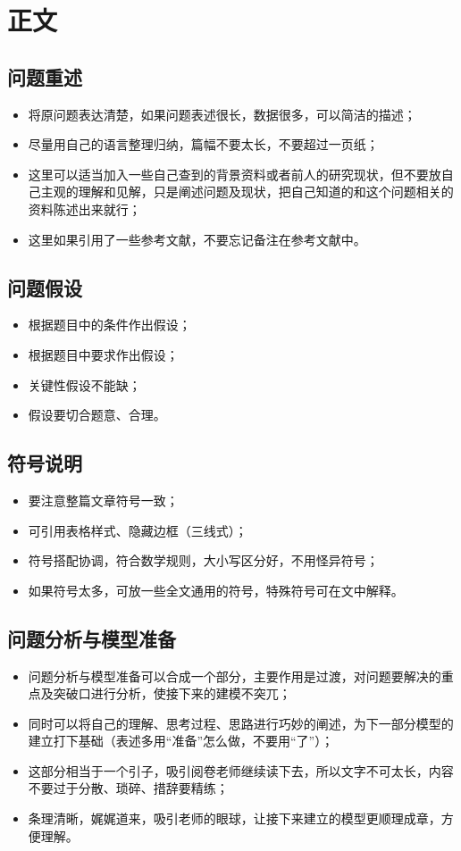 \documentclass[openany]{progbookcn}
\begin{document}
\section{正文}
\subsection{问题重述}
\begin{itemize}
    \item 将原问题表达清楚，如果问题表述很长，数据很多，可以简洁的描述；
    \item 尽量用自己的语言整理归纳，篇幅不要太长，不要超过一页纸；
    \item 这里可以适当加入一些自己查到的背景资料或者前人的研究现状，但不要放自己主观的理解和见解，只是阐述问题及现状，把自己知道的和这个问题相关的资料陈述出来就行；
    \item 这里如果引用了一些参考文献，不要忘记备注在参考文献中。
\end{itemize}
\subsection{问题假设}
\begin{itemize}
    \item 根据题目中的条件作出假设；
    \item 根据题目中要求作出假设；
    \item 关键性假设不能缺；
    \item 假设要切合题意、合理。
\end{itemize}
\subsection{符号说明}
\begin{itemize}
    \item 要注意整篇文章符号一致；
    \item 可引用表格样式、隐藏边框（三线式）；
    \item 符号搭配协调，符合数学规则，大小写区分好，不用怪异符号；
    \item 如果符号太多，可放一些全文通用的符号，特殊符号可在文中解释。
\end{itemize}
\subsection{问题分析与模型准备}
\begin{itemize}
    \item 问题分析与模型准备可以合成一个部分，主要作用是过渡，对问题要解决的重点及突破口进行分析，使接下来的建模不突兀；
    \item 同时可以将自己的理解、思考过程、思路进行巧妙的阐述，为下一部分模型的建立打下基础（表述多用“准备”怎么做，不要用“了”）；
    \item 这部分相当于一个引子，吸引阅卷老师继续读下去，所以文字不可太长，内容不要过于分散、琐碎、措辞要精练；
    \item 条理清晰，娓娓道来，吸引老师的眼球，让接下来建立的模型更顺理成章，方便理解。
\end{itemize}
\end{document}
